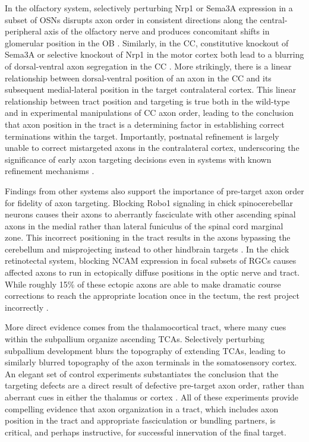 In the olfactory system, selectively perturbing Nrp1 or Sema3A expression in a subset of OSNs disrupts axon order in consistent directions along the central-peripheral axis of the olfactory nerve and produces concomitant shifts in glomerular position in the OB \cite{imai2009pre}.
Similarly, in the CC, constitutive knockout of Sema3A or selective knockout of Nrp1 in the motor cortex both lead to a blurring of dorsal-ventral axon segregation in the CC \cite{zhou2013axon}.
More strikingly, there is a linear relationship between dorsal-ventral position of an axon in the CC and its subsequent medial-lateral position in the target contralateral cortex.
This linear relationship between tract position and targeting is true both in the wild-type and in experimental manipulations of CC axon order, leading to the conclusion that axon position in the tract is a determining factor in establishing correct terminations within the target.
Importantly, postnatal refinement is largely unable to correct mistargeted axons in the contralateral cortex, underscoring the significance of early axon targeting decisions even in systems with known refinement mechanisms  \cite{zhou2013axon}.

Findings from other systems also support the importance of pre-target axon order for fidelity of axon targeting.
Blocking Robo1 signaling in chick spinocerebellar neurons causes their axons to aberrantly fasciculate with other ascending spinal axons in the medial rather than lateral funiculus of the spinal cord marginal zone.
This incorrect positioning in the tract results in the axons bypassing the cerebellum and misprojecting instead to other hindbrain targets \cite{sakai2012axon}.
In the chick retinotectal system, blocking NCAM expression in focal subsets of RGCs causes affected axons to run in ectopically diffuse positions in the optic nerve and tract.
While roughly 15\% of these ectopic axons are able to make dramatic course corrections to reach the appropriate location once in the tectum, the rest project incorrectly \cite{thanos1984fiber}.

More direct evidence comes from the thalamocortical tract, where many cues within the subpallium organize ascending TCAs.
Selectively perturbing subpallium development blurs the topography of extending TCAs, leading to similarly blurred topography of the axon terminals in the somatosensory cortex.
An elegant set of control experiments substantiates the conclusion that the targeting defects are a direct result of defective pre-target axon order, rather than aberrant cues in either the thalamus or cortex \cite{lokmane2013sensory}.
All of these experiments provide compelling evidence that axon organization in a tract, which includes axon position in the tract and appropriate fasciculation or bundling partners, is critical, and perhaps instructive, for successful innervation of the final target.

